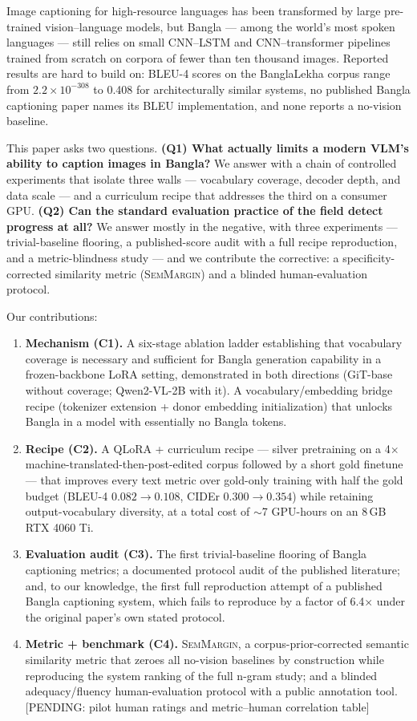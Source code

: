 \documentclass[11pt]{article}
\newcommand{\pending}[1]{\textcolor{red!70!black}{[PENDING: #1]}}
\newcommand{\semmargin}{\textsc{SemMargin}}
\begin{document}
Image captioning for high-resource languages has been transformed by
large pre-trained vision--language models, but Bangla --- among the
world's most spoken languages --- still relies on small CNN--LSTM and
CNN--transformer pipelines trained from scratch on corpora of fewer
than ten thousand images. Reported results are hard to build on: BLEU-4
scores on the BanglaLekha corpus range from $2.2\times10^{-308}$
\cite{palash2021} to 0.408 \cite{bornon2021} for architecturally
similar systems, no published Bangla captioning paper names its BLEU
implementation, and none reports a no-vision baseline.

This paper asks two questions. \textbf{(Q1) What actually limits a
modern VLM's ability to caption images in Bangla?} We answer with a
chain of controlled experiments that isolate three walls ---
vocabulary coverage, decoder depth, and data scale --- and a
curriculum recipe that addresses the third on a consumer GPU.
\textbf{(Q2) Can the standard evaluation practice of the field detect
progress at all?} We answer mostly in the negative, with three
experiments --- trivial-baseline flooring, a published-score audit
with a full recipe reproduction, and a metric-blindness study --- and
we contribute the corrective: a specificity-corrected similarity
metric (\semmargin{}) and a blinded human-evaluation protocol.

Our contributions:
\begin{enumerate}
  \item \textbf{Mechanism (C1).} A six-stage ablation ladder
  establishing that vocabulary coverage is necessary and sufficient
  for Bangla generation capability in a frozen-backbone LoRA setting,
  demonstrated in both directions (GiT-base without coverage;
  Qwen2-VL-2B with it). A vocabulary/embedding bridge recipe (tokenizer
  extension + donor embedding initialization) that unlocks Bangla in a
  model with essentially no Bangla tokens.
  \item \textbf{Recipe (C2).} A QLoRA + curriculum recipe --- silver
  pretraining on a 4$\times$ machine-translated-then-post-edited
  corpus followed by a short gold finetune --- that improves every
  text metric over gold-only training with half the gold budget
  (BLEU-4 $0.082 \to 0.108$, CIDEr $0.300 \to 0.354$) while retaining
  output-vocabulary diversity, at a total cost of $\sim$7 GPU-hours on
  an 8\,GB RTX 4060 Ti.
  \item \textbf{Evaluation audit (C3).} The first trivial-baseline
  flooring of Bangla captioning metrics; a documented protocol audit
  of the published literature; and, to our knowledge, the first full
  reproduction attempt of a published Bangla captioning system, which
  fails to reproduce by a factor of 6.4$\times$ under the original
  paper's own stated protocol.
  \item \textbf{Metric + benchmark (C4).} \semmargin{}, a
  corpus-prior-corrected semantic similarity metric that zeroes all
  no-vision baselines by construction while reproducing the system
  ranking of the full n-gram study; and a blinded adequacy/fluency
  human-evaluation protocol with a public annotation tool.
  \pending{pilot human ratings and metric--human correlation table}
\end{enumerate}
\end{document}
